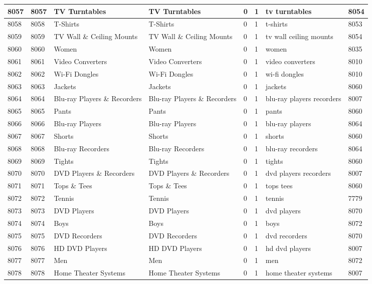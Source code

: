 \begin{longtable}{|l|l|l|l|l|l|l|l|}
8057 & 8057 & TV Turntables & TV Turntables & 0 & 1 & tv turntables & 8054 \\ \hline 
8058 & 8058 & T-Shirts & T-Shirts & 0 & 1 & t-shirts & 8053 \\ \hline 
8059 & 8059 & TV Wall \& Ceiling Mounts & TV Wall \& Ceiling Mounts & 0 & 1 & tv wall ceiling mounts & 8054 \\ \hline 
8060 & 8060 & Women & Women & 0 & 1 & women & 8035 \\ \hline 
8061 & 8061 & Video Converters & Video Converters & 0 & 1 & video converters & 8010 \\ \hline 
8062 & 8062 & Wi-Fi Dongles & Wi-Fi Dongles & 0 & 1 & wi-fi dongles & 8010 \\ \hline 
8063 & 8063 & Jackets & Jackets & 0 & 1 & jackets & 8060 \\ \hline 
8064 & 8064 & Blu-ray Players \& Recorders & Blu-ray Players \& Recorders & 0 & 1 & blu-ray players recorders & 8007 \\ \hline 
8065 & 8065 & Pants & Pants & 0 & 1 & pants & 8060 \\ \hline 
8066 & 8066 & Blu-ray Players & Blu-ray Players & 0 & 1 & blu-ray players & 8064 \\ \hline 
8067 & 8067 & Shorts & Shorts & 0 & 1 & shorts & 8060 \\ \hline 
8068 & 8068 & Blu-ray Recorders & Blu-ray Recorders & 0 & 1 & blu-ray recorders & 8064 \\ \hline 
8069 & 8069 & Tights & Tights & 0 & 1 & tights & 8060 \\ \hline 
8070 & 8070 & DVD Players \& Recorders & DVD Players \& Recorders & 0 & 1 & dvd players recorders & 8007 \\ \hline 
8071 & 8071 & Tops \& Tees & Tops \& Tees & 0 & 1 & tops tees & 8060 \\ \hline 
8072 & 8072 & Tennis & Tennis & 0 & 1 & tennis & 7779 \\ \hline 
8073 & 8073 & DVD Players & DVD Players & 0 & 1 & dvd players & 8070 \\ \hline 
8074 & 8074 & Boys & Boys & 0 & 1 & boys & 8072 \\ \hline 
8075 & 8075 & DVD Recorders & DVD Recorders & 0 & 1 & dvd recorders & 8070 \\ \hline 
8076 & 8076 & HD DVD Players & HD DVD Players & 0 & 1 & hd dvd players & 8007 \\ \hline 
8077 & 8077 & Men & Men & 0 & 1 & men & 8072 \\ \hline 
8078 & 8078 & Home Theater Systems & Home Theater Systems & 0 & 1 & home theater systems & 8007 \\ \hline 

\end{longtable}
